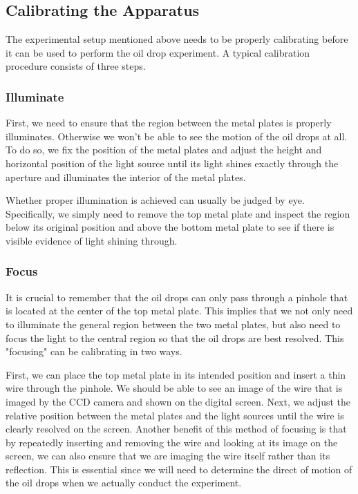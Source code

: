 \documentclass{article}
\begin{document}
\subsection{Calibrating the Apparatus}
The experimental setup mentioned above needs to be properly calibrating before it can be used to perform the oil drop experiment. A typical calibration procedure consists of three steps.
\subsubsection{Illuminate}
First, we need to ensure that the region between the metal plates is properly illuminates. Otherwise we won't be able to see the motion of the oil drops at all. To do so, we fix the position of the metal plates and adjust the height and horizontal position of the light source until its light shines exactly through the aperture and illuminates the interior of the metal plates.

Whether proper illumination is achieved can usually be judged by eye. Specifically, we simply need to remove the top metal plate and inspect the region below its original position and above the bottom metal plate to see if there is visible evidence of light shining through.
\subsubsection{Focus}
It is crucial to remember that the oil drops can only pass through a pinhole that is located at the center of the top metal plate. This implies that we not only need to illuminate the general region between the two metal plates, but also need to focus the light to the central region so that the oil drops are best resolved. This "focusing" can be calibrating in two ways.

First, we can place the top metal plate in its intended position and insert a thin wire through the pinhole. We should be able to see an image of the wire that is imaged by the CCD camera and shown on the digital screen. Next, we adjust the relative position between the metal plates and the light sources until the wire is clearly resolved on the screen. Another benefit of this method of focusing is that by repeatedly inserting and removing the wire and looking at its image on the screen, we can also ensure that we are imaging the wire itself rather than its reflection. This is essential since we will need to determine the direct of motion of the oil drops when we actually conduct the experiment.
\end{document}
